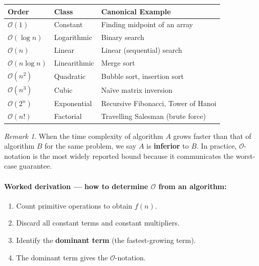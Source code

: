 \documentclass[11pt, a4paper, notitlepage]{report}
\theoremstyle{definition}
\theoremstyle{remark}
\newtheorem{remark}[theorem]{Remark}
\theoremstyle{definition}
\begin{document}
\begin{keyresult}[title={Standard Complexity Classes (slowest to fastest growth)}]
\begin{center}
\begin{tabularx}{\linewidth}{@{}l l X@{}}
\toprule
\textbf{Order} & \textbf{Class} & \textbf{Canonical Example} \\
\midrule
$\mathcal{O}(1)$           & Constant      & Finding midpoint of an array \\
$\mathcal{O}(\log n)$      & Logarithmic   & Binary search \\
$\mathcal{O}(n)$           & Linear        & Linear (sequential) search \\
$\mathcal{O}(n\log n)$     & Linearithmic  & Merge sort \\
$\mathcal{O}(n^2)$         & Quadratic     & Bubble sort, insertion sort \\
$\mathcal{O}(n^3)$         & Cubic         & Na\"{i}ve matrix inversion \\
$\mathcal{O}(2^n)$         & Exponential   & Recursive Fibonacci, Tower of Hanoi \\
$\mathcal{O}(n!)$          & Factorial     & Travelling Salesman (brute force) \\
\bottomrule
\end{tabularx}
\end{center}
\end{keyresult}

\begin{remark}
When the time complexity of algorithm $A$ grows faster than that of algorithm
$B$ for the same problem, we say $A$ is \textbf{inferior} to $B$.  In practice,
$\mathcal{O}$-notation is the most widely reported bound because it communicates
the worst-case guarantee.
\end{remark}

\paragraph{Worked derivation --- how to determine $\mathcal{O}$ from an algorithm:}
\begin{enumerate}
  \item Count primitive operations to obtain $f(n)$.
  \item Discard all constant terms and constant multipliers.
  \item Identify the \textbf{dominant term} (the fastest-growing term).
  \item The dominant term gives the $\mathcal{O}$-notation.
\end{enumerate}
\end{document}
